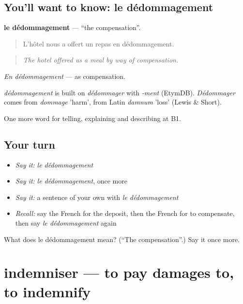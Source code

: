 \subsection*{You'll want to know: le dédommagement}
\textbf{le dédommagement} — \textquotedblleft{}the compensation\textquotedblright{}.

\begin{quote}
L'hôtel nous a offert un repas en dédommagement.
\end{quote}

\begin{quote}
\emph{The hotel offered us a meal by way of compensation.}
\end{quote}

\emph{En dédommagement} — as compensation.

\begin{cousinweb}
\emph{dédommagement} is built on \emph{dédommager} with \emph{-ment} (EtymDB). \emph{Dédommager} comes from \emph{dommage} 'harm', from Latin \emph{damnum} 'loss' (Lewis \& Short).
\end{cousinweb}

\begin{grammarlens}[title={What you've built}]
One more word for telling, explaining and describing at B1.
\end{grammarlens}

\subsection*{Your turn}
\begin{itemize}
\raggedright
  \item \emph{Say it:} \emph{le dédommagement}
  \item \emph{Say it:} \emph{le dédommagement}, once more
  \item \emph{Say it:} a sentence of your own with \emph{le dédommagement}
  \item \emph{Recall:} say the French for the deposit, then the French for to compensate, then say \emph{le dédommagement} again
\end{itemize}

\begin{tcolorbox}[breakable,colback=teal!4,colframe=teal!35!black,title={Before you move on}]
What does le dédommagement mean? (\textquotedblleft{}The compensation\textquotedblright{}.) Say it once more.
\end{tcolorbox}
\section[indemniser]{indemniser — to pay damages to, to indemnify}

